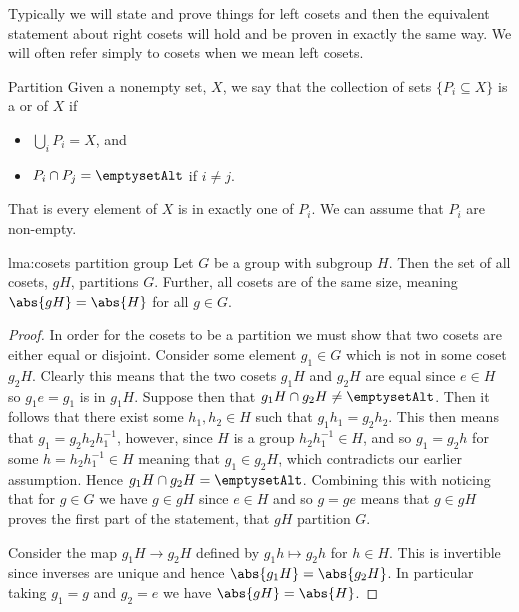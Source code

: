 \documentclass[fleqn]{NotesClass}
\newcommand*{\bigunion}{\bigcup}
\newcommand*{\intersection}{\cap}
\renewcommand{\emptyset}{\emptysetAlt}
\begin{document}
    Typically we will state and prove things for left cosets and then the equivalent statement about right cosets will hold and be proven in exactly the same way.
    We will often refer simply to cosets when we mean left cosets.
    
    \begin{dfn}{Partition}{}
        Given a nonempty set, \(X\), we say that the collection of sets \(\{P_i \subseteq X\}\) is a  or  of \(X\) if
        \begin{itemize}
            \item \(\bigunion_i P_i = X\), and
            \item \(P_i \intersection P_j = \emptyset\) if \(i \ne j\).
        \end{itemize}
        That is every element of \(X\) is in exactly one of \(P_i\).
        We can assume that \(P_i\) are non-empty.
    \end{dfn}
    
    \begin{lma}{}{lma:cosets partition group}
        Let \(G\) be a group with subgroup \(H\).
        Then the set of all cosets, \(gH\), partitions \(G\).
        Further, all cosets are of the same size, meaning \(\abs{gH} = \abs{H}\) for all \(g \in G\).
        
        \begin{proof}
            In order for the cosets to be a partition we must show that two cosets are either equal or disjoint.
            Consider some element \(g_1 \in G\) which is not in some coset \(g_2H\).
            Clearly this means that the two cosets \(g_1H\) and \(g_2H\) are equal since \(e \in H\) so \(g_1e = g_1\) is in \(g_1H\).
            Suppose then that \(g_1H \intersection g_2H \ne \emptyset\).
            Then it follows that there exist some \(h_1, h_2 \in H\) such that \(g_1h_1 = g_2h_2\).
            This then means that \(g_1 = g_2h_2h_1^{-1}\), however, since \(H\) is a group \(h_2h_1^{-1} \in H\), and so \(g_1 = g_2h\) for some \(h = h_2h_1^{-1} \in H\) meaning that \(g_1 \in g_2H\), which contradicts our earlier assumption.
            Hence \(g_1H \intersection g_2H = \emptyset\).
            Combining this with noticing that for \(g \in G\) we have \(g \in gH\) since \(e \in H\) and so \(g = ge\) means that \(g \in gH\) proves the first part of the statement, that \(gH\) partition \(G\).
            
            Consider the map \(g_1H \to g_2H\) defined by \(g_1h \mapsto g_2h\) for \(h \in H\).
            This is invertible since inverses are unique and hence \(\abs{g_1H} = \abs{g_2H}\).
            In particular taking \(g_1 = g\) and \(g_2 = e\) we have \(\abs{gH} = \abs{H}\).
        \end{proof}
    \end{lma}
 
\end{document}
